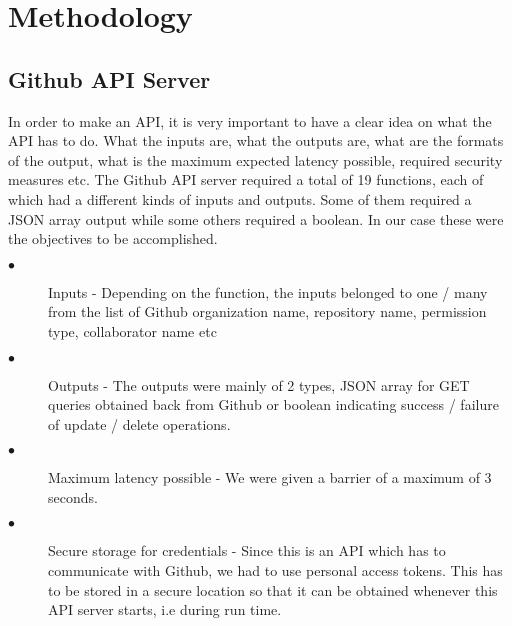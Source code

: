 
\chapter{Methodology} %

\label{Chapter 2} %



\section{Github API Server}

In order to make an API, it is very important to have a clear idea on what the API has to do. What the inputs are, what the outputs are, what are the formats of the output, what is the maximum expected latency possible, required security measures etc. The Github API server required a total of 19 functions, each of which had a different kinds of inputs and outputs. Some of them required a JSON array output while some others required a boolean. In our case these were the objectives to be accomplished.
\begin{description}
\item[$\bullet$] Inputs - Depending on the function, the inputs belonged to one / many from the list of Github organization name, repository name, permission type, collaborator name etc
\item[$\bullet$] Outputs - The outputs were mainly of 2 types, JSON array for GET queries obtained back from Github or boolean indicating success / failure of update / delete operations.
\item[$\bullet$] Maximum latency possible - We were given a barrier of a maximum of 3 seconds.
\item[$\bullet$] Secure storage for credentials - Since this is an API which has to communicate with Github, we had to use personal access tokens. This has to be stored in a secure location so that it can be obtained whenever this API server starts, i.e during run time.
\end{description}

